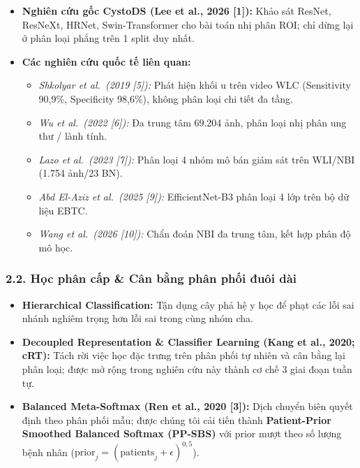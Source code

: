 \documentclass[
  11pt,
  a4paper,
]{article}
\providecommand{\tightlist}{%
  \setlength{\itemsep}{0pt}\setlength{\parskip}{0pt}}
\begin{document}
\begin{itemize}
\tightlist
\item
  \textbf{Nghiên cứu gốc CystoDS (Lee et al., 2026 {[}1{]}):} Khảo sát
  ResNet, ResNeXt, HRNet, Swin-Transformer cho bài toán nhị phân ROI;
  chỉ dừng lại ở phân loại phẳng trên 1 split duy nhất.
\item
  \textbf{Các nghiên cứu quốc tế liên quan:}

  \begin{itemize}
  \tightlist
  \item
    \emph{Shkolyar et al.~(2019 {[}5{]}):} Phát hiện khối u trên video
    WLC (Sensitivity 90,9\%, Specificity 98,6\%), không phân loại chi
    tiết đa tầng.
  \item
    \emph{Wu et al.~(2022 {[}6{]}):} Đa trung tâm 69.204 ảnh, phân loại
    nhị phân ung thư / lành tính.
  \item
    \emph{Lazo et al.~(2023 {[}7{]}):} Phân loại 4 nhóm mô bán giám sát
    trên WLI/NBI (1.754 ảnh/23 BN).
  \item
    \emph{Abd El-Aziz et al.~(2025 {[}9{]}):} EfficientNet-B3 phân loại
    4 lớp trên bộ dữ liệu EBTC.
  \item
    \emph{Wang et al.~(2026 {[}10{]}):} Chẩn đoán NBI đa trung tâm, kết
    hợp phân độ mô học.
  \end{itemize}
\end{itemize}

\subsubsection{2.2. Học phân cấp \& Cân bằng phân phối đuôi
dài}\label{hux1ecdc-phuxe2n-cux1ea5p-cuxe2n-bux1eb1ng-phuxe2n-phux1ed1i-ux111uuxf4i-duxe0i}

\begin{itemize}
\tightlist
\item
  \textbf{Hierarchical Classification:} Tận dụng cây phả hệ y học để
  phạt các lỗi sai nhánh nghiêm trọng hơn lỗi sai trong cùng nhóm cha.
\item
  \textbf{Decoupled Representation \& Classifier Learning (Kang et al.,
  2020; cRT):} Tách rời việc học đặc trưng trên phân phối tự nhiên và
  cân bằng lại phân loại; được mở rộng trong nghiên cứu này thành cơ chế
  3 giai đoạn tuần tự.
\item
  \textbf{Balanced Meta-Softmax (Ren et al., 2020 {[}3{]}):} Dịch chuyển
  biên quyết định theo phân phối mẫu; được chúng tôi cải tiến thành
  \textbf{Patient-Prior Smoothed Balanced Softmax (PP-SBS)} với prior
  mượt theo số lượng bệnh nhân
  (\(\text{prior}_j = (\text{patients}_j + \epsilon)^{0{,}5}\)).
\end{itemize}
\end{document}

